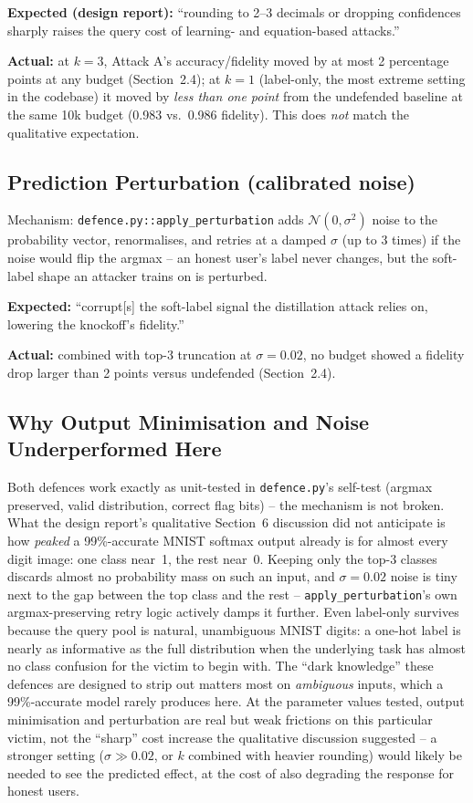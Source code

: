 \documentclass[11pt]{article}
\begin{document}
\textbf{Expected (design report):} ``rounding to 2--3 decimals or dropping
confidences sharply raises the query cost of learning- and equation-based
attacks.''

\textbf{Actual:} at $k{=}3$, Attack A's accuracy/fidelity moved by at most
2 percentage points at any budget (Section~2.4); at $k{=}1$ (label-only,
the most extreme setting in the codebase) it moved by \emph{less than one
point} from the undefended baseline at the same 10k budget (0.983 vs.\
0.986 fidelity). This does \emph{not} match the qualitative expectation.

\subsection{Prediction Perturbation (calibrated noise)}

Mechanism: \texttt{defence.py::apply\_perturbation} adds
$\mathcal N(0, \sigma^2)$ noise to the probability vector, renormalises, and
retries at a damped $\sigma$ (up to 3 times) if the noise would flip the
argmax -- an honest user's label never changes, but the soft-label shape an
attacker trains on is perturbed.

\textbf{Expected:} ``corrupt[s] the soft-label signal the distillation attack
relies on, lowering the knockoff's fidelity.''

\textbf{Actual:} combined with top-3 truncation at $\sigma=0.02$, no budget
showed a fidelity drop larger than 2 points versus undefended (Section~2.4).

\subsection{Why Output Minimisation and Noise Underperformed Here}

Both defences work exactly as unit-tested in \texttt{defence.py}'s
self-test (argmax preserved, valid distribution, correct flag bits) -- the
mechanism is not broken. What the design report's qualitative Section~6
discussion did not anticipate is how \emph{peaked} a 99\%-accurate MNIST
softmax output already is for almost every digit image: one class near~1,
the rest near~0. Keeping only the top-3 classes discards almost no
probability mass on such an input, and $\sigma=0.02$ noise is tiny next to
the gap between the top class and the rest -- \texttt{apply\_perturbation}'s
own argmax-preserving retry logic actively damps it further. Even
label-only survives because the query pool is natural, unambiguous MNIST
digits: a one-hot label is nearly as informative as the full distribution
when the underlying task has almost no class confusion for the victim to
begin with. The ``dark knowledge'' these defences are designed to strip
out matters most on \emph{ambiguous} inputs, which a 99\%-accurate model
rarely produces here. At the parameter values tested, output minimisation
and perturbation are real but weak frictions on this particular victim, not
the ``sharp'' cost increase the qualitative discussion suggested -- a
stronger setting ($\sigma \gg 0.02$, or $k$ combined with heavier rounding)
would likely be needed to see the predicted effect, at the cost of also
degrading the response for honest users.
\end{document}

